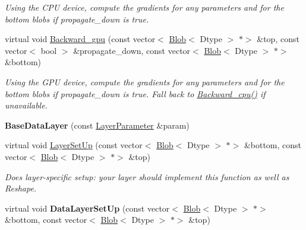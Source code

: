 \begin{DoxyCompactItemize}
\begin{DoxyCompactList}\small\item\em Using the C\+PU device, compute the gradients for any parameters and for the bottom blobs if propagate\+\_\+down is true. \end{DoxyCompactList}\item 
\mbox{\label{classcaffe_1_1_base_data_layer_a537656c76260c7f669c713506a5f4651}} 
virtual void \mbox{\hyperlink{classcaffe_1_1_base_data_layer_a537656c76260c7f669c713506a5f4651}{Backward\+\_\+gpu}} (const vector$<$ \mbox{\hyperlink{classcaffe_1_1_blob}{Blob}}$<$ Dtype $>$ $\ast$$>$ \&top, const vector$<$ bool $>$ \&propagate\+\_\+down, const vector$<$ \mbox{\hyperlink{classcaffe_1_1_blob}{Blob}}$<$ Dtype $>$ $\ast$$>$ \&bottom)
\begin{DoxyCompactList}\small\item\em Using the G\+PU device, compute the gradients for any parameters and for the bottom blobs if propagate\+\_\+down is true. Fall back to \mbox{\hyperlink{classcaffe_1_1_base_data_layer_a9d2c7a18383ff7625d80806ede1d9e3b}{Backward\+\_\+cpu()}} if unavailable. \end{DoxyCompactList}\item 
\mbox{\label{classcaffe_1_1_base_data_layer_abf8b0153155bc04864ebeeb4c117d7a1}} 
{\bfseries Base\+Data\+Layer} (const \mbox{\hyperlink{classcaffe_1_1_layer_parameter}{Layer\+Parameter}} \&param)
\item 
virtual void \mbox{\hyperlink{classcaffe_1_1_base_data_layer_a72276185eb4e5495de2d0e0d34bc8eda}{Layer\+Set\+Up}} (const vector$<$ \mbox{\hyperlink{classcaffe_1_1_blob}{Blob}}$<$ Dtype $>$ $\ast$$>$ \&bottom, const vector$<$ \mbox{\hyperlink{classcaffe_1_1_blob}{Blob}}$<$ Dtype $>$ $\ast$$>$ \&top)
\begin{DoxyCompactList}\small\item\em Does layer-\/specific setup\+: your layer should implement this function as well as Reshape. \end{DoxyCompactList}\item 
\mbox{\label{classcaffe_1_1_base_data_layer_a7477b54323c917eda218e21ac43ac2f4}} 
virtual void {\bfseries Data\+Layer\+Set\+Up} (const vector$<$ \mbox{\hyperlink{classcaffe_1_1_blob}{Blob}}$<$ Dtype $>$ $\ast$$>$ \&bottom, const vector$<$ \mbox{\hyperlink{classcaffe_1_1_blob}{Blob}}$<$ Dtype $>$ $\ast$$>$ \&top)

\end{DoxyCompactItemize}
